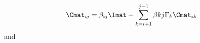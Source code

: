 \begin{equation}
\Cmat_{i j} = \beta_{i j} \Imat - \sum \limits^{j - 1}_{k = i+1} \beta{k j} \Gamma_k \Cmat_{i k}
\end{equation}
and